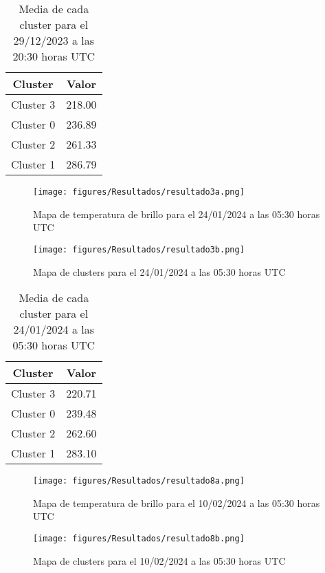 \documentclass[twocolumn]{IECEjournal} %
\begin{document}
\begin{table}[h!]
    \centering
    \label{tab5}
    \begin{tabular}{|c|c|}
    \hline
    \textbf{Cluster} & \textbf{Valor} \\
    \hline
    Cluster 3 & 218.00 \\
    Cluster 0 & 236.89 \\
    Cluster 2 & 261.33 \\
    Cluster 1 & 286.79 \\
    \hline
    \end{tabular}
    \caption{Media de cada cluster para el 29/12/2023 a las 20:30 horas UTC}
\end{table}

\begin{figure}[H]
	\centering
	\texttt{[image: figures/Resultados/resultado3a.png]}
	\caption{Mapa de temperatura de brillo para el 24/01/2024 a las 05:30 horas UTC}
	\label{fig8}
\end{figure}


\begin{figure}[H]
	\centering
	\texttt{[image: figures/Resultados/resultado3b.png]}
	\caption{Mapa de clusters para el 24/01/2024 a las 05:30 horas UTC}
	\label{fig9}
\end{figure}

\begin{table}[h!]
    \centering
    \label{tab6}
    \begin{tabular}{|c|c|}
    \hline
    \textbf{Cluster} & \textbf{Valor} \\
    \hline
    Cluster 3 & 220.71 \\
    Cluster 0 & 239.48 \\
    Cluster 2 & 262.60 \\
    Cluster 1 & 283.10 \\
    \hline
    \end{tabular}
    \caption{Media de cada cluster para el 24/01/2024 a las 05:30 horas UTC}
\end{table}

\begin{figure}[H]
	\centering
	\texttt{[image: figures/Resultados/resultado8a.png]}
	\caption{Mapa de temperatura de brillo para el 10/02/2024 a las 05:30 horas UTC}
	\label{fig10}
\end{figure}

\begin{figure}[H]
	\centering
	\texttt{[image: figures/Resultados/resultado8b.png]}
	\caption{Mapa de clusters para el 10/02/2024 a las 05:30 horas UTC}
	\label{fig11}
\end{figure}
\end{document}
